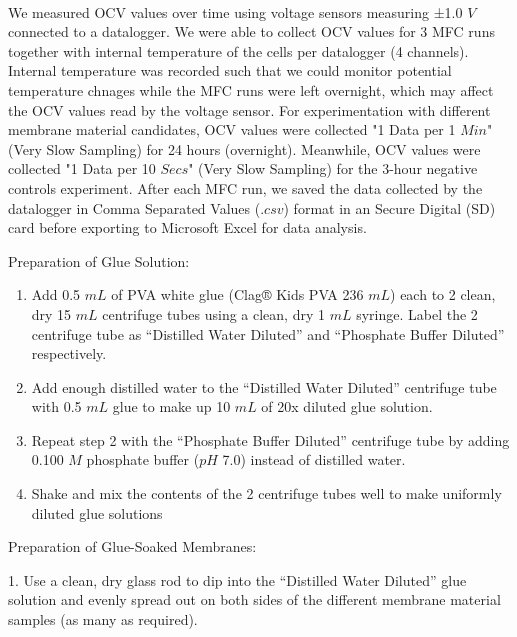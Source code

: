 \documentclass[12pt, twocolumn, a4paper]{article}
\begin{document}
        \paragraph{}We measured OCV values over time using voltage sensors measuring ±1.0 $V$ connected to a datalogger. We were able to collect OCV values for 3 MFC runs together with internal temperature of the cells per datalogger (4 channels). Internal temperature was recorded such that we could monitor potential temperature chnages while the MFC runs were left overnight, which may affect the OCV values read by the voltage sensor. For experimentation with different membrane material candidates, OCV values were collected "1 Data per 1 $Min$" (Very Slow Sampling) for 24 hours (overnight). Meanwhile, OCV values were collected "1 Data per 10 $Secs$" (Very Slow Sampling) for the 3-hour negative controls experiment. After each MFC run, we saved the data collected by the datalogger in Comma Separated Values ($.csv$) format in an Secure Digital (SD) card before exporting to Microsoft Excel for data analysis.
        
        Preparation of Glue Solution:
        \begin{enumerate}
                \item Add 0.5 $mL$ of PVA white glue (Clag® Kids PVA 236 $mL$) each to 2 clean, dry 15 $mL$ centrifuge tubes using a clean, dry 1 $mL$ syringe. Label the 2 centrifuge tube as “Distilled Water Diluted” and “Phosphate Buffer Diluted” respectively.
                
                \item Add enough distilled water to the “Distilled Water Diluted” centrifuge tube with 0.5 $mL$ glue to make up 10 $mL$ of 20x diluted glue solution.
                
                \item Repeat step 2 with the “Phosphate Buffer Diluted” centrifuge tube by adding 0.100 $M$ phosphate buffer ($pH$ 7.0) instead of distilled water.
                
                \item Shake and mix the contents of the 2 centrifuge tubes well to make uniformly diluted glue solutions
        \end{enumerate}
        

        Preparation of Glue-Soaked Membranes:
        
        1. Use a clean, dry glass rod to dip into the “Distilled Water Diluted” glue solution and evenly spread out on both sides of the different membrane material samples (as many as required).
        
\end{document}
